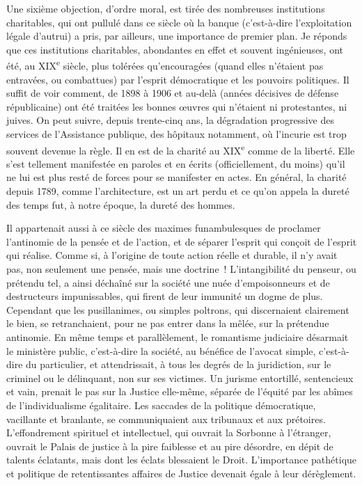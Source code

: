 \documentclass[french,twoside]{book} %
\begin{document}
Une sixième objection, d’ordre moral, est tirée des nombreuses institutions charitables, qui ont pullulé dans ce siècle où la banque (c’est-à-dire l’exploitation légale d’autrui) a pris, par ailleurs, une importance de premier plan. Je réponds que ces institutions charitables, abondantes en effet et souvent ingénieuses, ont été, au XIX\textsuperscript{e} siècle, plus tolérées qu’encouragées (quand elles n’étaient pas entravées, ou combattues) par l’esprit démocratique et les pouvoirs politiques. Il suffit de voir comment, de 1898 à 1906 et au-delà (années décisives de défense républicaine) ont été traitées les bonnes œuvres qui n’étaient ni protestantes, ni juives. On peut suivre, depuis trente-cinq ans, la dégradation progressive des services de l’Assistance publique, des hôpitaux notamment, où l’incurie est trop souvent devenue la règle. Il en est de la charité au XIX\textsuperscript{e} comme de la liberté. Elle s’est tellement manifestée en paroles et en écrits (officiellement, du moins) qu’il ne lui est plus resté de forces pour se manifester en actes. En général, la charité depuis 1789, comme l’architecture, est un art perdu et ce qu’on appela la dureté des temps fut, à notre époque, la dureté des hommes.\par
Il appartenait aussi à ce siècle des maximes funambulesques de proclamer l’antinomie de la pensée et de l’action, et de séparer l’esprit qui conçoit de l’esprit qui réalise. Comme si, à l’origine de toute action réelle et durable, il n’y avait pas, non seulement une pensée, mais une doctrine ! L’intangibilité du penseur, ou prétendu tel, a ainsi déchaîné sur la société une nuée d’empoisonneurs et de destructeurs impunissables, qui firent de leur immunité un dogme de plus. Cependant que les pusillanimes, ou simples poltrons, qui discernaient clairement le bien, se retranchaient, pour ne pas entrer dans la mêlée, sur la prétendue antinomie. En même temps et parallèlement, le romantisme judiciaire désarmait le ministère public, c’est-à-dire la société, au bénéfice de l’avocat simple, c’est-à-dire du particulier, et attendrissait, à tous les degrés de la juridiction, sur le criminel ou le délinquant, non sur ses victimes. Un jurisme entortillé, sentencieux et vain, prenait le pas sur la Justice elle-même, séparée de l’équité par les abîmes de l’individualisme égalitaire. Les saccades de la politique démocratique, vacillante et branlante, se communiquaient aux tribunaux et aux prétoires. L’effondrement spirituel et intellectuel, qui ouvrait la Sorbonne à l’étranger, ouvrait le Palais de justice à la pire faiblesse et au pire désordre, en dépit de talents éclatants, mais dont les éclats blessaient le Droit. L’importance pathétique et politique de retentissantes affaires de Justice devenait égale à leur dérèglement.\par
\end{document}
